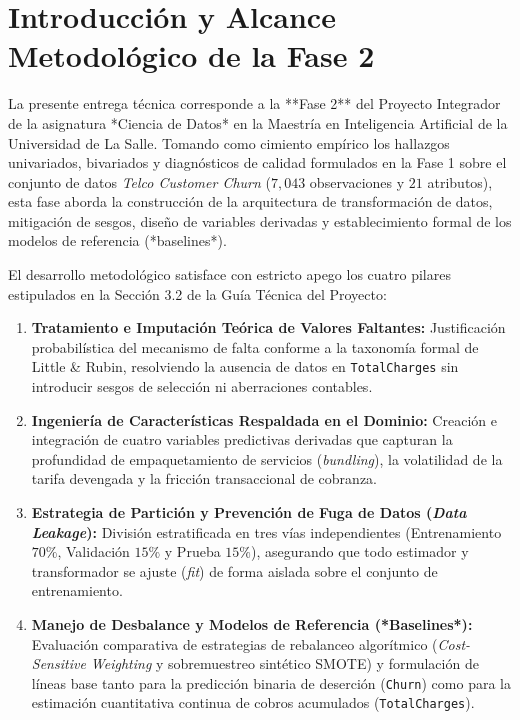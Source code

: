 \documentclass[11pt,letterpaper]{article}
\begin{document}
\section{Introducción y Alcance Metodológico de la Fase 2}

La presente entrega técnica corresponde a la **Fase 2** del Proyecto Integrador de la asignatura *Ciencia de Datos* en la Maestría en Inteligencia Artificial de la Universidad de La Salle. Tomando como cimiento empírico los hallazgos univariados, bivariados y diagnósticos de calidad formulados en la Fase 1 sobre el conjunto de datos \textit{Telco Customer Churn} ($7,043$ observaciones y $21$ atributos), esta fase aborda la construcción de la arquitectura de transformación de datos, mitigación de sesgos, diseño de variables derivadas y establecimiento formal de los modelos de referencia (*baselines*).

El desarrollo metodológico satisface con estricto apego los cuatro pilares estipulados en la Sección 3.2 de la Guía Técnica del Proyecto:
\begin{enumerate}
    \item \textbf{Tratamiento e Imputación Teórica de Valores Faltantes:} Justificación probabilística del mecanismo de falta conforme a la taxonomía formal de Little \& Rubin, resolviendo la ausencia de datos en \texttt{TotalCharges} sin introducir sesgos de selección ni aberraciones contables.
    \item \textbf{Ingeniería de Características Respaldada en el Dominio:} Creación e integración de cuatro variables predictivas derivadas que capturan la profundidad de empaquetamiento de servicios (\textit{bundling}), la volatilidad de la tarifa devengada y la fricción transaccional de cobranza.
    \item \textbf{Estrategia de Partición y Prevención de Fuga de Datos (\textit{Data Leakage}):} División estratificada en tres vías independientes (Entrenamiento $70\%$, Validación $15\%$ y Prueba $15\%$), asegurando que todo estimador y transformador se ajuste (\textit{fit}) de forma aislada sobre el conjunto de entrenamiento.
    \item \textbf{Manejo de Desbalance y Modelos de Referencia (*Baselines*):} Evaluación comparativa de estrategias de rebalanceo algorítmico (\textit{Cost-Sensitive Weighting} y sobremuestreo sintético SMOTE) y formulación de líneas base tanto para la predicción binaria de deserción (\texttt{Churn}) como para la estimación cuantitativa continua de cobros acumulados (\texttt{TotalCharges}).
\end{enumerate}
\end{document}
